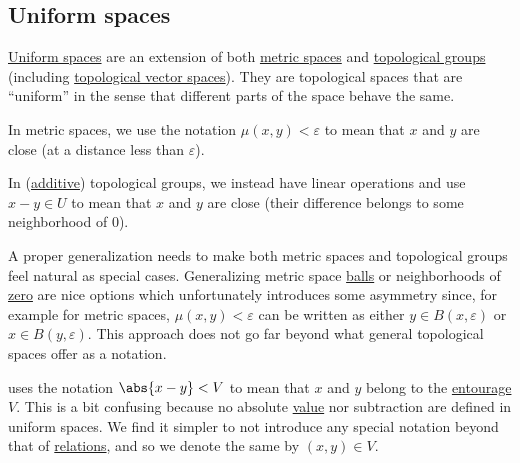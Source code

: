 \subsection{Uniform spaces}\label{subsec:uniform_spaces}

\begin{remark}\label{rem:entourage_notation}
  \hyperref[def:uniform_space]{Uniform spaces} are an extension of both \hyperref[def:metric_space]{metric spaces} and \hyperref[def:topological_group]{topological groups} (including \hyperref[def:topological_vector_space]{topological vector spaces}). They are topological spaces that are \enquote{uniform} in the sense that different parts of the space behave the same.

  In metric spaces, we use the notation \( \mu(x, y) < \varepsilon \) to mean that \( x \) and \( y \) are close (at a distance less than \( \varepsilon \)).

  In (\hyperref[rem:additive_semigroup]{additive}) topological groups, we instead have linear operations and use \( x - y \in U \) to mean that \( x \) and \( y \) are close (their difference belongs to some neighborhood of \( 0 \)).

  A proper generalization needs to make both metric spaces and topological groups feel natural as special cases. Generalizing metric space \hyperref[def:metric_space/ball]{balls} or neighborhoods of \hyperref[thm:origin_neighborhoods_in_topological_groups]{zero} are nice options which unfortunately introduces some asymmetry since, for example for metric spaces, \( \mu(x, y) < \varepsilon \) can be written as either \( y \in B(x, \varepsilon) \) or \( x \in B(y, \varepsilon) \). This approach does not go far beyond what general topological spaces offer as a notation.

  \cite[section 8]{Engelking1989} uses the notation \( \abs{x - y} < V \) to mean that \( x \) and \( y \) belong to the \hyperref[def:entourage]{entourage} \( V \). This is a bit confusing because no absolute \hyperref[def:absolute_value]{value} nor subtraction are defined in uniform spaces. We find it simpler to not introduce any special notation beyond that of \hyperref[def:relation]{relations}, and so we denote the same by \( (x, y) \in V \).
\end{remark}

